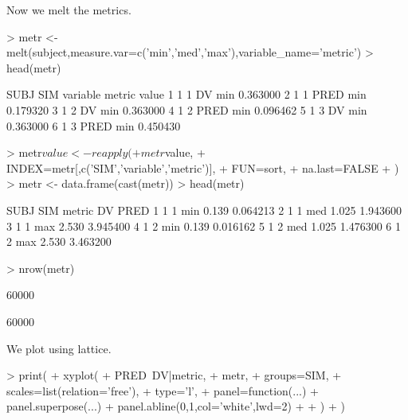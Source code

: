 Now we melt the metrics.
\begin{Schunk}
\begin{Sinput}
> metr <- melt(subject,measure.var=c('min','med','max'),variable_name='metric')
> head(metr)
\end{Sinput}
\begin{Soutput}
  SUBJ SIM variable metric    value
1    1   1       DV    min 0.363000
2    1   1     PRED    min 0.179320
3    1   2       DV    min 0.363000
4    1   2     PRED    min 0.096462
5    1   3       DV    min 0.363000
6    1   3     PRED    min 0.450430
\end{Soutput}
\begin{Sinput}
> metr$value <- reapply(
+ 	metr$value,
+ 	INDEX=metr[,c('SIM','variable','metric')],
+ 	FUN=sort,
+ 	na.last=FALSE
+ )
> metr <- data.frame(cast(metr))
> head(metr)
\end{Sinput}
\begin{Soutput}
  SUBJ SIM metric    DV     PRED
1    1   1    min 0.139 0.064213
2    1   1    med 1.025 1.943600
3    1   1    max 2.530 3.945400
4    1   2    min 0.139 0.016162
5    1   2    med 1.025 1.476300
6    1   2    max 2.530 3.463200
\end{Soutput}
\begin{Sinput}
> nrow(metr)
\end{Sinput}
\begin{Soutput}
[1] 60000
\end{Soutput}
\begin{Soutput}
[1] 60000
\end{Soutput}
\end{Schunk}
We plot using lattice.
\begin{Schunk}
\begin{Sinput}
> print(
+ 	xyplot(
+ 		PRED~DV|metric,
+ 		metr,
+ 		groups=SIM,
+ 		scales=list(relation='free'),
+ 		type='l',
+ 		panel=function(...){
+ 			panel.superpose(...)
+ 			panel.abline(0,1,col='white',lwd=2)
+ 		}
+ 	)
+ )
\end{Sinput}
\end{Schunk}
